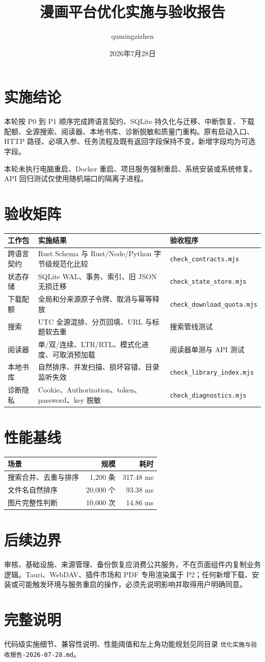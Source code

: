 \documentclass[UTF8,a4paper,11pt]{ctexart}
\title{漫画平台优化实施与验收报告}
\author{qumingzizhen}
\date{2026年7月28日}
\begin{document}
\maketitle

\section{实施结论}
本轮按 P0 到 P1 顺序完成跨语言契约、SQLite 持久化与迁移、中断恢复、下载配额、全源搜索、阅读器、本地书库、诊断脱敏和质量门重构。原有启动入口、HTTP 路径、必填入参、任务流程及既有返回字段保持不变，新增字段均为可选字段。

本轮未执行电脑重启、Docker 重启、项目服务强制重启、系统安装或系统修复。API 回归测试仅使用随机端口的隔离子进程。

\section{验收矩阵}
\begin{longtable}{p{}p{}p{}}
\toprule
工作包 & 实施结果 & 验收程序\\
\midrule
\endhead
跨语言契约 & Rust Schema 与 Rust/Node/Python 字节级规范化比较 & \texttt{check\_contracts.mjs}\\
状态存储 & SQLite WAL、事务、索引、旧 JSON 无损迁移 & \texttt{check\_state\_store.mjs}\\
下载配额 & 全局和分来源原子令牌、取消与幂等释放 & \texttt{check\_download\_quota.mjs}\\
搜索 & UTC 全源混排、分页回填、URL 与标题软去重 & 搜索管线测试\\
阅读器 & 单/双/连续、LTR/RTL、模式化进度、可取消预加载 & 阅读器单测与 API 测试\\
本地书库 & 自然排序、并发扫描、损坏容错、目录监听失效 & \texttt{check\_library\_index.mjs}\\
诊断隐私 & Cookie、Authorization、token、password、key 脱敏 & \texttt{check\_diagnostics.mjs}\\
\bottomrule
\end{longtable}

\section{性能基线}
\begin{tabular}{lrr}
\toprule
场景 & 规模 & 耗时\\
\midrule
搜索合并、去重与排序 & 1,200 条 & 317.48 ms\\
文件名自然排序 & 20,000 个 & 93.38 ms\\
图片完整性判断 & 10,000 次 & 14.86 ms\\
\bottomrule
\end{tabular}

\section{后续边界}
审核、基础设施、来源管理、备份恢复应消费公共服务，不在页面组件内复制业务逻辑。Tauri、WebDAV、插件市场和 PDF 专用渲染属于 P2；任何新增下载、安装或可能触发环境与服务重启的操作，必须先说明影响并取得用户明确同意。

\section{完整说明}
代码级实施细节、兼容性说明、性能阈值和左上角功能规划见同目录
\texttt{优化实施与验收报告-2026-07-28.md}。
\end{document}
